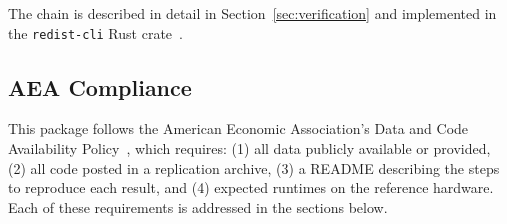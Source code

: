 \noindent The chain is described in detail in Section~\ref{sec:verification}
and implemented in the \texttt{redist-cli} Rust crate~\cite{dellaLibera2026recursive}.

\subsection*{AEA Compliance}

This package follows the American Economic Association's Data and Code
Availability Policy~\cite{aeaDataPolicy}, which requires:
(1) all data publicly available or provided,
(2) all code posted in a replication archive,
(3) a README describing the steps to reproduce each result,
and (4) expected runtimes on the reference hardware.
Each of these requirements is addressed in the sections below.
